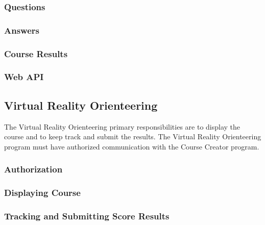\subsubsection{Questions}

\subsubsection{Answers}

\subsubsection{Course Results}

\subsubsection{Web API}

\subsection{Virtual Reality Orienteering}
The Virtual Reality Orienteering primary responsibilities are to display the course and to keep track and submit the results. The Virtual Reality Orienteering program must have authorized communication with the Course Creator program.

\subsubsection{Authorization}

\subsubsection{Displaying Course}

\subsubsection{Tracking and Submitting Score Results}

